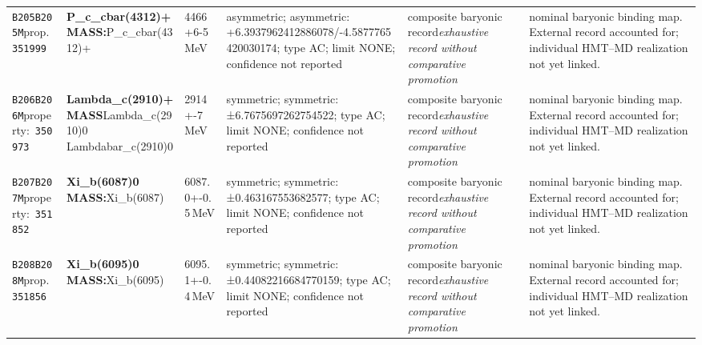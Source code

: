 \begin{landscape}
\begin{longtable}{L{1.85cm}L{4.45cm}L{2.35cm}L{4.05cm}L{3.35cm}L{7.15cm}}
\texttt{B205}\newline \texttt{B205M}\newline prop.\ \texttt{351999} & \textbf{P\_\allowbreak{}c\_\allowbreak{}cbar(4312)+ MASS:}\newline P\_\allowbreak{}c\_\allowbreak{}cbar(4312)+ & 4466+6-5\,MeV & asymmetric; asymmetric: +6.3937962412886078/-4.5877765420030174; type AC; limit NONE; confidence not reported & composite baryonic record\newline \emph{exhaustive record without comparative promotion} & nominal baryonic binding map. External record accounted for; individual HMT--MD realization not yet linked. \\
\texttt{B206}\newline \texttt{B206M}\newline property:\ \texttt{350973} & \textbf{Lambda\_\allowbreak{}c(2910)+ MASS}\newline Lambda\_\allowbreak{}c(2910)0 \textbar{}\allowbreak{} Lambdabar\_\allowbreak{}c(2910)0 & 2914+-7\,MeV & symmetric; symmetric: ±6.7675697262754522; type AC; limit NONE; confidence not reported & composite baryonic record\newline \emph{exhaustive record without comparative promotion} & nominal baryonic binding map. External record accounted for; individual HMT--MD realization not yet linked. \\
\texttt{B207}\newline \texttt{B207M}\newline property:\ \texttt{351852} & \textbf{Xi\_\allowbreak{}b(6087)0 MASS:}\newline Xi\_\allowbreak{}b(6087) & 6087.0+-0.5\,MeV & symmetric; symmetric: ±0.463167553682577; type AC; limit NONE; confidence not reported & composite baryonic record\newline \emph{exhaustive record without comparative promotion} & nominal baryonic binding map. External record accounted for; individual HMT--MD realization not yet linked. \\
\texttt{B208}\newline \texttt{B208M}\newline prop.\ \texttt{351856} & \textbf{Xi\_\allowbreak{}b(6095)0 MASS:}\newline Xi\_\allowbreak{}b(6095) & 6095.1+-0.4\,MeV & symmetric; symmetric: ±0.44082216684770159; type AC; limit NONE; confidence not reported & composite baryonic record\newline \emph{exhaustive record without comparative promotion} & nominal baryonic binding map. External record accounted for; individual HMT--MD realization not yet linked. \\

\end{longtable}
\end{landscape}
